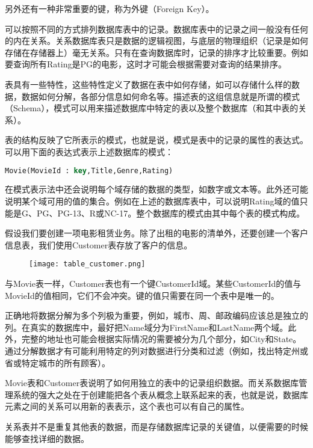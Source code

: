 另外还有一种非常重要的键，称为外键（Foreign Key）。

可以按照不同的方式排列数据库表中的记录。数据库表中的记录之间一般没有任何的内在关系。关系数据库表只是数据的逻辑视图，与底层的物理组织（记录是如何存储在存储器上）毫无关系。只有在查询数据库时，记录的排序才比较重要。例如要查询所有Rating是PG的电影，这时才可能会根据需要对查询的结果排序。

表具有一些特性，这些特性定义了数据在表中如何存储，如可以存储什么样的数据，数据如何分解，各部分信息如何命名等。描述表的这组信息就是所谓的模式（Schema），模式可以用来描述数据库中特定的表以及整个数据库（和其中表的关系）。
	
表的结构反映了它所表示的模式，也就是说，模式是表中的记录的属性的表达式。可以用下面的表达式表示上述数据库的模式：

\begin{lstlisting}[language=SQL]
Movie(MovieId : key,Title,Genre,Rating)
\end{lstlisting}
	
在模式表示法中还会说明每个域存储的数据的类型，如数字或文本等。此外还可能说明某个域可用的值的集合。例如在上述的数据库表中，可以说明Rating域的值只能是G、PG、PG-13、R或NC-17。整个数据库的模式由其中每个表的模式构成。

假设我们要创建一项电影租赁业务。除了出租的电影的清单外，还要创建一个客户信息表，我们使用Customer表存放了客户的信息。

\begin{figure}[!h]
\centering
\texttt{[image: table\_customer.png]}
\label{table_customer}
\end{figure}

与Movie表一样，Customer表也有一个键CustomerId域。某些CustomerId的值与MovieId的值相同，它们不会冲突。键的值只需要在同一个表中是唯一的。


正确地将数据分解为多个列极为重要，例如，城市、周、邮政编码应该总是独立的列。在真实的数据库中，最好把Name域分为FirstName和LastName两个域。此外，完整的地址也可能会根据实际情况的需要被分为几个部分，如City和State。通过分解数据才有可能利用特定的列对数据进行分类和过滤（例如，找出特定州或省或特定城市的所有顾客）。


Movie表和Customer表说明了如何用独立的表中的记录组织数据。而关系数据库管理系统的强大之处在于创建能把各个表从概念上联系起来的表，也就是说，数据库元素之间的关系可以用新的表表示，这个表也可以有自己的属性。

关系表并不是重复其他表的数据，而是存储数据库记录的关键值，以便需要的时候能够查找详细的数据。

